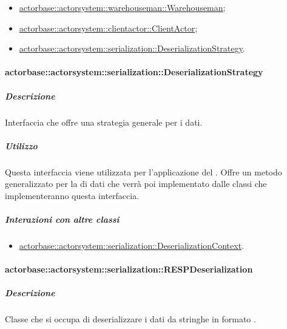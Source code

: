 \documentclass{scalatekids-article}
\begin{document}
\begin{itemize}

\item \hyperref[sec:actorbase::actorsystem::warehouseman::Warehouseman]{actorbase::actorsystem::warehouseman::Warehouseman};
\item \hyperref[sec:actorbase::actorsystem::clientactor::ClientActor]{actorbase::actorsystem::clientactor::ClientActor};
\item \hyperref[sec:actorbase::actorsystem::serialization::DeserializationStrategy]{actorbase::actorsystem::serialization::DeserializationStrategy}.

\end{itemize}

\paragraph{actorbase::actorsystem::serialization::DeserializationStrategy}
\label{sec:actorbase::actorsystem::serialization::DeserializationStrategy}

\subparagraph{Descrizione}

Interfaccia che offre una strategia generale per  i dati.

\subparagraph{Utilizzo}

Questa interfaccia viene utilizzata per l'applicazione del 
. Offre un metodo generalizzato per la
 di dati che verrà poi implementato dalle classi che
implementeranno questa interfaccia.

\subparagraph{Interazioni con altre classi}

\begin{itemize}

\item \hyperref[sec:actorbase::actorsystem::serialization::DeserializationContext]{actorbase::actorsystem::serialization::DeserializationContext}.

\end{itemize}

\paragraph{actorbase::actorsystem::serialization::RESPDeserialization}
\label{sec:actorbase::actorsystem::serialization::RESPDeserialization}

\subparagraph{Descrizione}

Classe che si occupa di deserializzare i dati da stringhe in formato .
\end{document}
